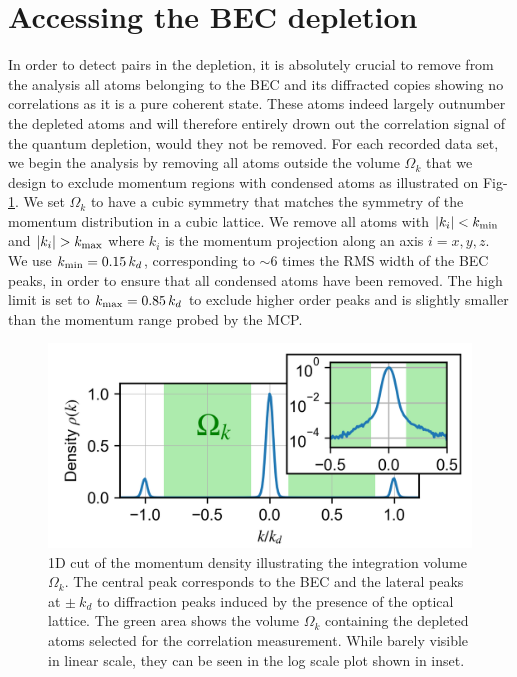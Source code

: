 \section{Accessing the BEC depletion}

In order to detect \kmk pairs in the depletion, it is absolutely crucial to remove from the analysis all atoms belonging to the BEC and its diffracted copies showing no correlations as it is a pure coherent state. These atoms indeed largely outnumber the depleted atoms and will therefore entirely drown out the \kmk correlation signal of the quantum depletion, would they not be removed. 
For each recorded data set, we begin the analysis by removing all atoms outside the volume $\Omega_k$ that we design to exclude momentum regions with condensed atoms as illustrated on Fig-\ref{fig:omega_k}. We set $\Omega_k$ to have a cubic symmetry that matches the symmetry of the momentum distribution in a cubic lattice. We remove all atoms with $|k_i| < k_{\rm{min}}$ and $|k_i| > k_{\rm{max}}$ where $k_i$ is the momentum projection along an axis $i=x,y,z$. We use $k_{\rm{min}}=0.15 \, k_d$, corresponding to $\sim 6$ times the RMS width of the BEC peaks, in order to ensure that all condensed atoms have been removed. The high limit is set to $k_{\rm{max}}=0.85 \, k_d$ to exclude higher order peaks and is slightly smaller than the momentum range probed by the MCP.

\begin{figure}
    \centering
    \includegraphics[width=\textwidth]{Fig/Chapter4/densite.png}
    \caption{1D cut of the momentum density illustrating the integration volume $\Omega_k$. The central peak corresponds to the BEC and the lateral peaks at $\pm \ k_d$ to diffraction peaks induced by the presence of the optical lattice. The green area shows the volume $\Omega_k$ containing the depleted atoms selected for the correlation measurement. While barely visible in linear scale, they can be seen in the log scale plot shown in inset.}
    \label{fig:omega_k}
\end{figure}


